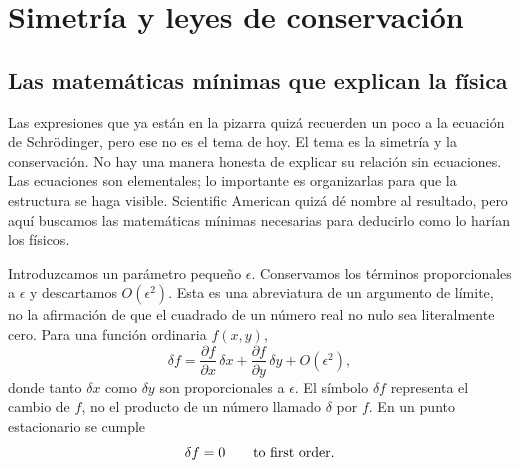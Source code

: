 \chapter{Simetría y leyes de conservación}


\section{Las matemáticas mínimas que explican la física}

Las expresiones que ya están en la pizarra quizá recuerden un poco a la ecuación de Schrödinger, pero ese no es el tema de hoy. El tema es la simetría y la conservación. No hay una manera honesta de explicar su relación sin ecuaciones. Las ecuaciones son elementales; lo importante es organizarlas para que la estructura se haga visible. Scientific American quizá dé nombre al resultado, pero aquí buscamos las matemáticas mínimas necesarias para deducirlo como lo harían los físicos.

Introduzcamos un parámetro pequeño \(\epsilon\). Conservamos los términos proporcionales a \(\epsilon\) y descartamos \(O(\epsilon^2)\). Esta es una abreviatura de un argumento de límite, no la afirmación de que el cuadrado de un número real no nulo sea literalmente cero. Para una función ordinaria \(f(x,y)\),
\begin{equation}
  \delta f
  =\frac{\partial f}{\partial x}\,\delta x
   +\frac{\partial f}{\partial y}\,\delta y
   +O(\epsilon^2),
  \label{eq:first-variation-f}
\end{equation}
donde tanto \(\delta x\) como \(\delta y\) son proporcionales a \(\epsilon\). El símbolo \(\delta f\) representa el cambio de \(f\), no el producto de un número llamado \(\delta\) por \(f\). En un punto estacionario se cumple
\begin{equation}
  \delta f=0
  \qquad\hbox{to first order.}
  \label{eq:stationary-f}
\end{equation}

